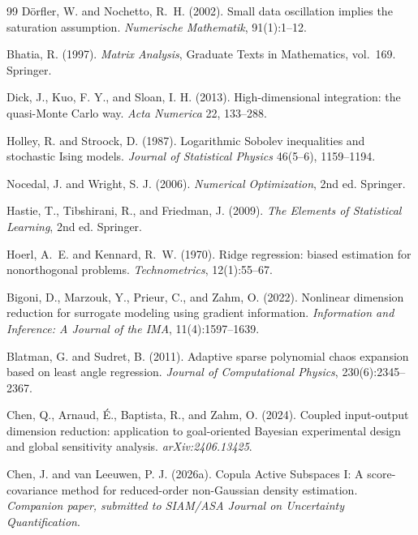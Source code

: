 \begin{thebibliography}{99}
D\"orfler, W. and Nochetto, R.~H. (2002).
Small data oscillation implies the saturation assumption.
\emph{Numerische Mathematik}, 91(1):1--12.

Bhatia, R. (1997).
\emph{Matrix Analysis}, Graduate Texts in Mathematics, vol.~169.
Springer.

Dick, J., Kuo, F. Y., and Sloan, I. H. (2013).
High-dimensional integration: the quasi-Monte Carlo way.
\emph{Acta Numerica} 22, 133--288.

Holley, R. and Stroock, D. (1987).
Logarithmic Sobolev inequalities and stochastic Ising models.
\emph{Journal of Statistical Physics} 46(5--6), 1159--1194.

Nocedal, J. and Wright, S. J. (2006).
\emph{Numerical Optimization}, 2nd ed.
Springer.

Hastie, T., Tibshirani, R., and Friedman, J. (2009).
\emph{The Elements of Statistical Learning}, 2nd ed.
Springer.

Hoerl, A.~E. and Kennard, R.~W. (1970).
Ridge regression: biased estimation for nonorthogonal problems.
\emph{Technometrics}, 12(1):55--67.

Bigoni, D., Marzouk, Y., Prieur, C., and Zahm, O. (2022).
Nonlinear dimension reduction for surrogate modeling using gradient information.
\emph{Information and Inference: A Journal of the IMA}, 11(4):1597--1639.

Blatman, G. and Sudret, B. (2011).
Adaptive sparse polynomial chaos expansion based on least angle regression.
\emph{Journal of Computational Physics}, 230(6):2345--2367.

Chen, Q., Arnaud, \'E., Baptista, R., and Zahm, O. (2024).
Coupled input-output dimension reduction: application to goal-oriented Bayesian experimental design and global sensitivity analysis.
\emph{arXiv:2406.13425}.

Chen, J. and van Leeuwen, P. J. (2026a).
Copula Active Subspaces I: A score-covariance method for reduced-order non-Gaussian density estimation.
\emph{Companion paper, submitted to SIAM/ASA Journal on Uncertainty Quantification}.


\end{thebibliography}
